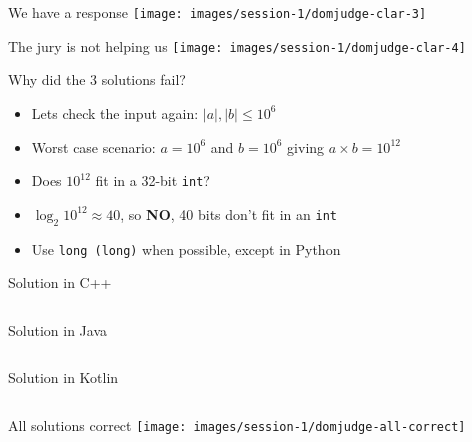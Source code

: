 \documentclass[11pt,pdf, aspectratio=169]{beamer}
\begin{document}
  \begin{frame}{We have a response}
    \texttt{[image: images/session-1/domjudge-clar-3]}
  \end{frame}
  \begin{frame}{The jury is not helping us}
    \texttt{[image: images/session-1/domjudge-clar-4]}
  \end{frame}
  \begin{frame}{Why did the 3 solutions fail?}
    \begin{itemize}
      \item <1-> Lets check the input again: $|a|,|b| \leq 10^6$
      \item <2-> Worst case scenario: $a=10^6$ and $b=10^6$ giving  $a \times b = 10^{12}$
      \item <3-> Does $10^{12}$ fit in a 32-bit \texttt{int}?
      \item <4-> $\log_2 10^{12} \approx 40$, so \textbf{NO}, 40 bits don't fit in an \texttt{int}
      \item <5-> Use \texttt{long (long)} when possible, except in Python
    \end{itemize}
  \end{frame}
  \begin{frame}[containsverbatim]{Solution in C++}
    \inputminted{c++}{code/session-1/c++/example.cpp}
  \end{frame}
  \begin{frame}[containsverbatim]{Solution in Java}
    \inputminted{java}{code/session-1/java/example.java}
  \end{frame}
  \begin{frame}[containsverbatim]{Solution in Kotlin}
    \inputminted{kotlin}{code/session-1/kotlin/example.kt}
  \end{frame}
  \begin{frame}{All solutions correct}
    \texttt{[image: images/session-1/domjudge-all-correct]}
  \end{frame}
\end{document}
